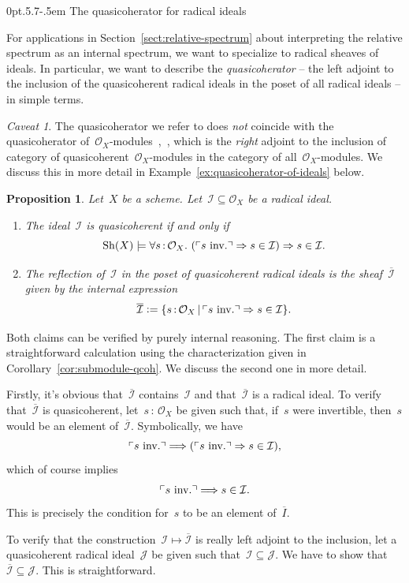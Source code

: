 \documentclass[10pt,reqno,a4paper]{amsbook}
\makeatletter
\theoremstyle{definition}
\theoremstyle{plain}
\newtheorem{prop}[defn]{Proposition}
\theoremstyle{remark}
\newtheorem{caveat}[defn]{Caveat}
\renewcommand{\O}{\mathcal{O}}
\newcommand{\I}{\mathcal{I}}
\newcommand{\J}{\mathcal{J}}
\newcommand{\Sh}{\mathrm{Sh}}
\newcommand{\?}{\,{:}\,}
\renewcommand{\_}{\mathpunct{.}\,}
\newcommand{\speak}[1]{\ulcorner\text{\textnormal{#1}}\urcorner}
\newcommand{\inv}{inv.\@}
\newcommand{\stacksproject}[1]{\cite[{\href{http://stacks.math.columbia.edu/tag/#1}{Tag~#1}}]{stacks-project}}
\newcommand{\defeq}{\vcentcolon=}
\renewenvironment{proof}[1][\proofname]{\par
  \pushQED{\qed}%
  \normalfont \topsep6\p@\@plus6\p@\relax
  \trivlist
  \item[\hskip\labelsep
        \itshape
    #1\@addpunct{.}]\ignorespaces
}{%
  \popQED\endtrivlist\@endpefalse
}
\def\subsection{\@startsection{subsection}{2}%
  {0pt}{.5\linespacing\@plus.7\linespacing}{-.5em}%
  {\normalfont\bfseries}}
\makeatother
\begin{document}
\subsection{The quasicoherator for radical ideals}

For applications in Section~\ref{sect:relative-spectrum} about interpreting the
relative spectrum as an internal spectrum, we want to specialize to radical
sheaves of ideals. In particular, we want to describe the \emph{quasicoherator} --
the left adjoint to the inclusion of the quasicoherent radical ideals in the
poset of all radical ideals -- in simple terms.

\begin{caveat}The quasicoherator we refer to does \emph{not} coincide with the
quasicoherator
of~$\O_X$-modules~\stacksproject{077P},~\cite{thomason-trobaugh}, which is the
\emph{right} adjoint to the inclusion of category of
quasicoherent~$\O_X$-modules in the category of all~$\O_X$-modules. We discuss
this in more detail in Example~\ref{ex:quasicoherator-of-ideals} below.
\end{caveat}

\begin{prop}\label{prop:quasicoherator-structure-sheaf}
Let~$X$ be a scheme. Let~$\I \subseteq \O_X$ be a radical ideal.
\begin{enumerate}
\item The ideal~$\I$ is quasicoherent if and only if
\[ \Sh(X) \models \forall s\?\O_X\_ (\speak{$s$ \inv} \Rightarrow s\in\I)
\Rightarrow s\in\I. \]
\item The reflection of~$\I$ in the poset of quasicoherent radical ideals is
the sheaf~$\overline{\I}$ given by the internal expression
\[ \overline{\I} \defeq \{ s\?\O_X \,|\, \speak{$s$ \inv} \Rightarrow s\in\I
\}. \]
\end{enumerate}
\end{prop}
\begin{proof}Both claims can be verified by purely internal reasoning. The
first claim is a straightforward calculation using the characterization given in
Corollary~\ref{cor:submodule-qcoh}. We discuss the second one in more detail.

Firstly, it's obvious that~$\overline{\I}$ contains~$\I$ and
that~$\overline{\I}$ is a radical ideal. To verify that~$\overline{\I}$ is
quasicoherent, let~$s\?\O_X$ be given such that, if~$s$ were invertible,
then~$s$ would be an element of~$\overline{\I}$. Symbolically, we have
\[ \speak{$s$ \inv} \Longrightarrow (\speak{$s$ \inv} \Rightarrow s\in\I), \]
which of course implies
\[ \speak{$s$ \inv} \Longrightarrow s\in\I. \]
This is precisely the condition for~$s$ to be an element of~$\overline{I}$.

To verify that the construction~$\I \mapsto \overline{\I}$ is really left
adjoint to the inclusion, let a quasicoherent radical ideal~$\J$ be given such
that~$\I \subseteq \J$. We have to show that~$\overline{\I} \subseteq \J$. This
is straightforward.
\end{proof}
\end{document}
